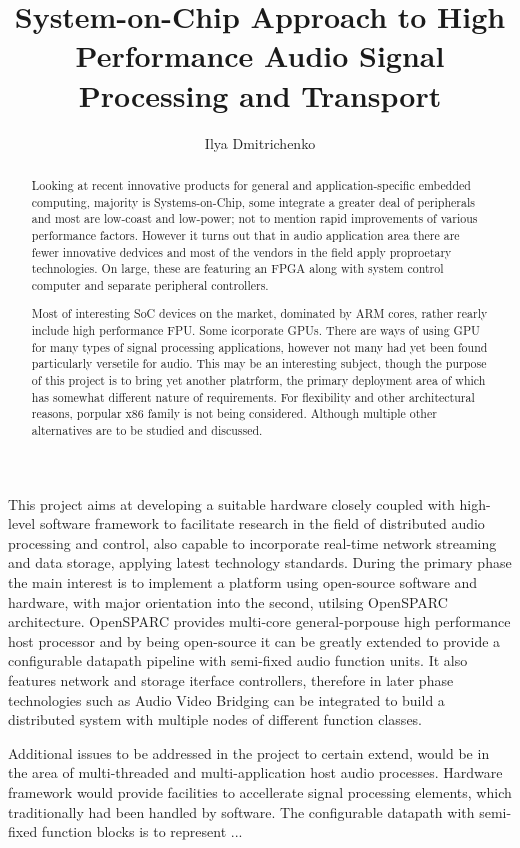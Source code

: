 \documentclass{article}
\title{ System-on-Chip Approach to High Performance
	Audio Signal Processing and Transport }
\author{ Ilya Dmitrichenko }
\begin{document}
\maketitle

\begin{abstract}
\em

 Looking at recent innovative products for general and
 application-specific embedded computing, majority is
 Systems-on-Chip, some integrate a greater deal of peripherals
 and most are low-coast and low-power; not to mention rapid
 improvements of various performance factors.
  However it turns out that in audio application area there
 are fewer innovative dedvices and most of the vendors in the
 field apply proproetary technologies. On large, these are
 featuring an FPGA along with system control computer and
 separate peripheral controllers.

  Most of interesting SoC devices on the market, dominated by
 ARM cores, rather rearly include high performance FPU. Some
 icorporate GPUs. There are ways of using GPU for many types
 of signal processing applications, however not many had yet
 been found particularly versetile for audio. This may be an
 interesting subject, though the purpose of this project is
 to bring yet another platrform, the primary deployment area
 of which has somewhat different nature of requirements.
  For flexibility and other architectural reasons, porpular
 x86 family is not being considered. Although multiple other
 alternatives are to be studied and discussed.

\end{abstract}


  This project aims at developing a suitable hardware closely coupled
  with high-level software framework to facilitate research in the field
  of distributed audio processing and control, also capable to incorporate 
  real-time network streaming and data storage, applying latest technology
  standards.
  During the primary phase the main interest is to implement a platform
  using open-source software and hardware, with major orientation into
  the second, utilsing OpenSPARC architecture.
  OpenSPARC provides multi-core general-porpouse high performance host
  processor and by being open-source it can be greatly extended to provide 
  a configurable datapath pipeline with semi-fixed audio function units.
  It also features network and storage iterface controllers, therefore in
  later phase technologies such as Audio Video Bridging can be integrated
  to build a distributed system with multiple nodes of different function
  classes.

  Additional issues to be addressed in the project to certain extend,
  would be in the area of multi-threaded and multi-application host
  audio processes. Hardware framework would provide facilities to
  accellerate signal processing elements, which traditionally had
  been handled by software.  
  The configurable datapath with semi-fixed function blocks is to
  represent ... 
\end{document}
